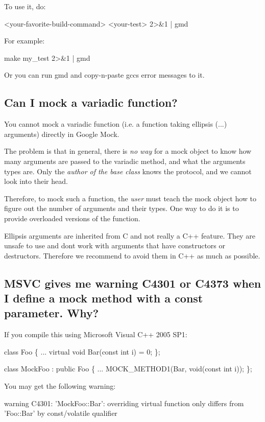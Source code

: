 To use it, do\+: 
\begin{DoxyCode}
<your-favorite-build-command> <your-test> 2>&1 | gmd
\end{DoxyCode}


For example\+: 
\begin{DoxyCode}
make my\_test 2>&1 | gmd
\end{DoxyCode}


Or you can run {\ttfamily gmd} and copy-\/n-\/paste gcc\textquotesingle{}s error messages to it.

\subsection*{Can I mock a variadic function?}

You cannot mock a variadic function (i.\+e. a function taking ellipsis ({\ttfamily ...}) arguments) directly in Google Mock.

The problem is that in general, there is {\itshape no way} for a mock object to know how many arguments are passed to the variadic method, and what the arguments\textquotesingle{} types are. Only the {\itshape author of the base class} knows the protocol, and we cannot look into their head.

Therefore, to mock such a function, the {\itshape user} must teach the mock object how to figure out the number of arguments and their types. One way to do it is to provide overloaded versions of the function.

Ellipsis arguments are inherited from C and not really a C++ feature. They are unsafe to use and don\textquotesingle{}t work with arguments that have constructors or destructors. Therefore we recommend to avoid them in C++ as much as possible.

\subsection*{M\+S\+VC gives me warning C4301 or C4373 when I define a mock method with a const parameter. Why?}

If you compile this using Microsoft Visual C++ 2005 S\+P1\+: 
\begin{DoxyCode}
\textcolor{keyword}{class }Foo \{
  ...
  \textcolor{keyword}{virtual} \textcolor{keywordtype}{void} Bar(\textcolor{keyword}{const} \textcolor{keywordtype}{int} i) = 0;
\};

\textcolor{keyword}{class }MockFoo : \textcolor{keyword}{public} Foo \{
  ...
  MOCK\_METHOD1(Bar, \textcolor{keywordtype}{void}(\textcolor{keyword}{const} \textcolor{keywordtype}{int} i));
\};
\end{DoxyCode}
 You may get the following warning\+: 
\begin{DoxyCode}
warning C4301: 'MockFoo::Bar': overriding virtual function only differs from 'Foo::Bar' by const/volatile
       qualifier
\end{DoxyCode}


